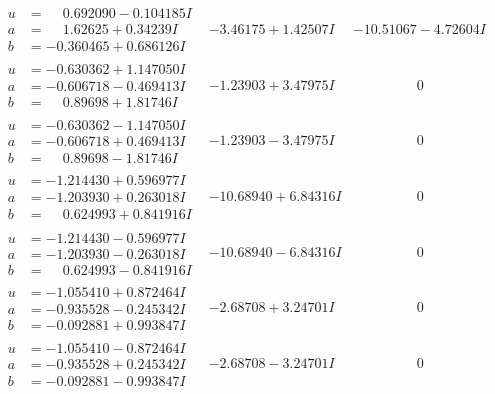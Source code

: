 \documentclass[1p]{elsarticle_modified}
\theoremstyle{definition}
\begin{document}
$$\begin{array}{c|c|c}
\begin{aligned}
u &= \phantom{-}0.692090 - 0.104185 I \\
a &= \phantom{-}1.62625 + 0.34239 I \\
b &= -0.360465 + 0.686126 I\end{aligned}
 & -3.46175 + 1.42507 I & -10.51067 - 4.72604 I \\ \hline\begin{aligned}
u &= -0.630362 + 1.147050 I \\
a &= -0.606718 - 0.469413 I \\
b &= \phantom{-}0.89698 + 1.81746 I\end{aligned}
 & -1.23903 + 3.47975 I & \phantom{-0.000000 } 0 \\ \hline\begin{aligned}
u &= -0.630362 - 1.147050 I \\
a &= -0.606718 + 0.469413 I \\
b &= \phantom{-}0.89698 - 1.81746 I\end{aligned}
 & -1.23903 - 3.47975 I & \phantom{-0.000000 } 0 \\ \hline\begin{aligned}
u &= -1.214430 + 0.596977 I \\
a &= -1.203930 + 0.263018 I \\
b &= \phantom{-}0.624993 + 0.841916 I\end{aligned}
 & -10.68940 + 6.84316 I & \phantom{-0.000000 } 0 \\ \hline\begin{aligned}
u &= -1.214430 - 0.596977 I \\
a &= -1.203930 - 0.263018 I \\
b &= \phantom{-}0.624993 - 0.841916 I\end{aligned}
 & -10.68940 - 6.84316 I & \phantom{-0.000000 } 0 \\ \hline\begin{aligned}
u &= -1.055410 + 0.872464 I \\
a &= -0.935528 - 0.245342 I \\
b &= -0.092881 + 0.993847 I\end{aligned}
 & -2.68708 + 3.24701 I & \phantom{-0.000000 } 0 \\ \hline\begin{aligned}
u &= -1.055410 - 0.872464 I \\
a &= -0.935528 + 0.245342 I \\
b &= -0.092881 - 0.993847 I\end{aligned}
 & -2.68708 - 3.24701 I & \phantom{-0.000000 } 0 \\ \hline\begin{aligned}

\end{aligned}
\end{array}$$
\end{document}
